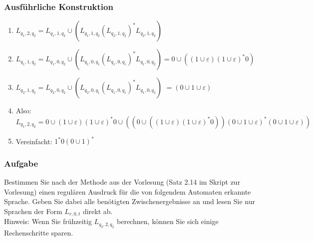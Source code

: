 
\begin{frame}
\frametitle{Ausführliche Konstruktion}
\begin{figure}[H]
\begin{center}
\end{center}
\end{figure}
\begin{enumerate}
\item $L_{q_1,2,q_2} = L_{q_1,1,q_2}\cup(L_{q_1,1,q_2}(L_{q_2,1,q_2})^*L_{q_2,1,q_2})$
\item $L_{q_1,1,q_2} = L_{q_1,0,q_2}\cup(L_{q_1,0,q_1}(L_{q_1,0,q_1})^*L_{q_1,0,q_2}) = 0\cup((1\cup\varepsilon)(1\cup\varepsilon)^*0)$
\item $L_{q_2,1,q_2} = L_{q_2,0,q_2}\cup(L_{q_2,0,q_1}(L_{q_1,0,q_1})^*L_{q_1,0,q_2})$ $ = (0\cup1\cup\varepsilon)$
\item Also: $L_{q_1,2,q_2} = 0\cup(1\cup\varepsilon)(1\cup\varepsilon)^*0\cup((0\cup((1\cup\varepsilon)(1\cup\varepsilon)^*0))(0\cup1\cup\varepsilon)^*(0\cup1\cup\varepsilon))$
\item Vereinfacht: $1^*0(0\cup1)^*$
\end{enumerate}
\end{frame}

\begin{frame}
\frametitle{Aufgabe}
Bestimmen Sie nach der Methode aus der Vorlesung (Satz 2.14 im Skript zur Vorlesung) einen
regulären Ausdruck für die von folgendem Automaten erkannte Sprache. Geben Sie dabei alle benötigten Zwischenergebnisse an und lesen Sie nur Sprachen der Form $L_{r,0,t}$ direkt ab.
\\ Hinweis: Wenn Sie frühzeitig $L_{q_3, 2, q_2}$ berechnen, können Sie sich einige Rechenschritte sparen.
\begin{figure}[H]
\begin{center}
\end{center}
\end{figure}
\end{frame}

